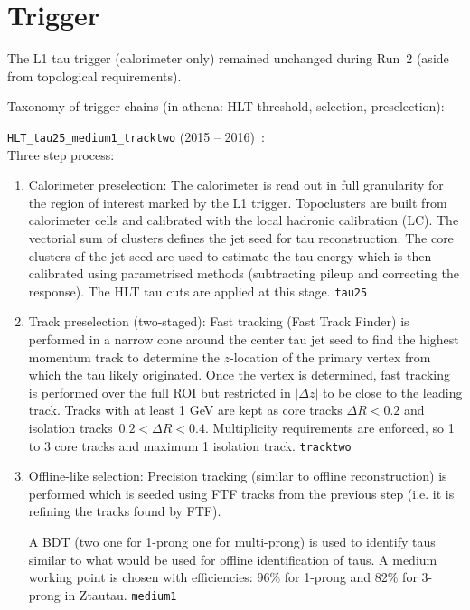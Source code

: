 \section{Trigger}
\label{sec:exp_trigger}


The L1 tau trigger (calorimeter only) remained unchanged during Run~2
(aside from topological requirements).

Taxonomy of trigger chains (in athena: HLT threshold, selection, preselection):

\vspace{1em}

\verb|HLT_tau25_medium1_tracktwo| (2015 -- 2016)~\cite{ATLAS-CONF-2017-061}:\\
Three step process:
\begin{enumerate}
\item Calorimeter preselection: The calorimeter is read out in full
  granularity for the region of interest marked by the L1
  trigger. Topoclusters are built from calorimeter cells and
  calibrated with the local hadronic calibration (LC). The vectorial
  sum of clusters defines the jet seed for tau reconstruction. The
  core clusters of the jet seed are used to estimate the tau energy
  which is then calibrated using parametrised methods (subtracting
  pileup and correcting the response). The HLT tau \pT cuts are
  applied at this stage. \verb|tau25|

\item Track preselection (two-staged): Fast tracking (Fast Track
  Finder) is performed in a narrow cone around the center tau jet seed
  to find the highest momentum track to determine the $z$-location of
  the primary vertex from which the tau likely originated. Once the
  vertex is determined, fast tracking is performed over the full ROI
  but restricted in $|\Delta z|$ to be close to the leading
  track. Tracks with at least 1 GeV are kept as core tracks
  $\Delta R < 0.2$ and isolation tracks~$0.2 < \Delta R <
  0.4$. Multiplicity requirements are enforced, so 1 to 3 core tracks
  and maximum 1 isolation track. \verb|tracktwo|

\item Offline-like selection: Precision tracking (similar to offline
  reconstruction) is performed which is seeded using FTF tracks from
  the previous step (i.e. it is refining the tracks found by FTF).


  A BDT (two one for
  1-prong one for multi-prong) is used to identify taus similar to
  what would be used for offline identification of taus. A medium
  working point is chosen with efficiencies: 96\% for 1-prong and 82\%
  for 3-prong in Ztautau. \verb|medium1|
\end{enumerate}

